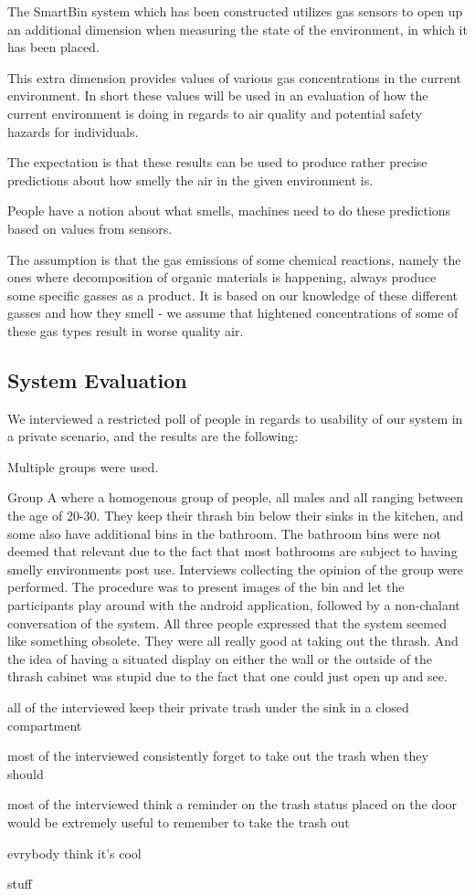 The SmartBin system which has been constructed utilizes gas sensors to open up an additional dimension when measuring the state of the environment, in which it has been placed.

This extra dimension provides values of various gas concentrations in the current environment.
In short these values will be used in an evaluation of how the current environment is doing in regards to air quality and potential safety hazards for individuals.

The expectation is that these results can be used to produce rather precise predictions about how smelly the air in the given environment is.

People have a notion about what smells, machines need to do these predictions based on values from sensors.

The assumption is that the gas emissions of some chemical reactions, namely the ones where decomposition of organic materials is happening, always produce some specific gasses as a product.
It is based on our knowledge of these different gasses and how they smell - we assume that hightened concentrations of some of these gas types result in worse quality air.


\subsection{System Evaluation}

We interviewed a restricted poll of people in regards to usability of our system in a private scenario, and the results are the following:

Multiple groups were used.

Group A where a homogenous group of people, all males and all ranging between the age of 20-30.
They keep their thrash bin below their sinks in the kitchen, and some also have additional bins in the bathroom.
The bathroom bins were not deemed that relevant due to the fact that most bathrooms are subject to having smelly environments post use.
Interviews collecting the opinion of the group  were performed.
The procedure was to present images of the bin and let the participants play around with the android application, followed by a non-chalant conversation of the system.
All three people expressed that the system seemed like something obsolete. They were all really good at taking out the thrash.
And the idea of having a situated display on either the wall or the outside of the thrash cabinet was stupid due to the fact that one could just open up and see.

all of the interviewed keep their private trash under the sink in a closed compartment

most of the interviewed consistently forget to take out the trash when they should

most of the interviewed think a reminder on the trash status placed on the door would be extremely useful to remember to take the trash out

evrybody think it's cool

stuff
